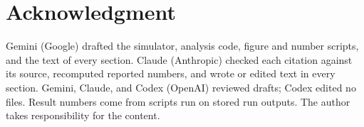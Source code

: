 \documentclass[conference]{IEEEtran}
\newif\ifanonymous
\begin{document}







\section*{Acknowledgment}
Gemini (Google) drafted the simulator, analysis code, figure and number scripts, and the text of every section.
Claude (Anthropic) checked each citation against its source, recomputed reported numbers, and wrote or edited
text in every section. Gemini, Claude, and Codex (OpenAI) reviewed drafts; Codex edited no files. Result numbers
come from scripts run on stored run outputs. \ifanonymous The authors take\else The author takes\fi{} responsibility for the content.



\end{document}
